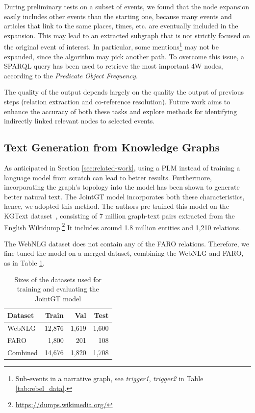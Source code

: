 \documentclass[
hf, %
]{ceurart}
\begin{document}
During preliminary tests on a subset of events, we found that the node expansion easily includes other events than the starting one, because many events and articles that link to the same places, times, etc. are eventually included in the expansion. This may lead to an extracted subgraph that is not strictly focused on the original event of interest. In particular, some mentions\footnote{Sub-events in a narrative graph, see \textit{trigger1}, \textit{trigger2} in Table \ref{tab:rebel_data}.} may not be expanded, since the algorithm may pick another path. To overcome this issue, a SPARQL query has been used to retrieve the most important 4W nodes, according to the \textit{Predicate Object Frequency}.

The quality of the output depends largely on the quality the output of previous steps (relation extraction and co-reference resolution). Future work aims to enhance the accuracy of both these tasks and explore methods for identifying indirectly linked relevant nodes to selected events.

\subsection{Text Generation from Knowledge Graphs}
As anticipated in Section \ref{sec:related-work}, using a PLM instead of training a language model from scratch can lead to better results. Furthermore, incorporating the graph's topology into the model has been shown to generate better natural text. The JointGT model \cite{JointGT} incorporates both these characteristics, hence, we adopted this method. The authors pre-trained this model on the KGText dataset~\cite{KGtext}, consisting of 7 million graph-text pairs extracted from the English Wikidump.\footnote{\url{https://dumps.wikimedia.org/}} It includes around 1.8 million entities and 1,210 relations.

The WebNLG dataset does not contain any of the FARO relations. Therefore, we fine-tuned the model on a merged dataset, combining the WebNLG and FARO, as in Table \ref{tab:splits_dataset_jointgt}.

\begin{table}[h]
\centering
\begin{tabular}{|l|r|r|r|}
\hline
\textbf{Dataset} & \textbf{Train} & \textbf{Val} & \textbf{Test} \\ \hline
WebNLG           & 12,876          & 1,619         & 1,600          \\ \hline
FARO             & 1,800           & 201          & 108            \\ \hline
Combined         & 14,676          & 1,820         & 1,708          \\ \hline
\end{tabular}
\caption{Sizes of the datasets used for training and evaluating the JointGT model}
\label{tab:splits_dataset_jointgt}
\end{table}
\end{document}
